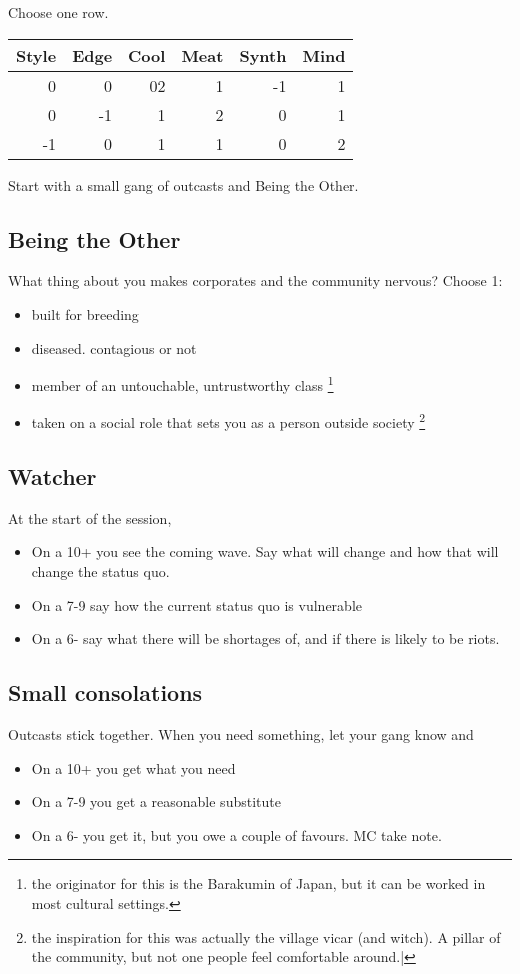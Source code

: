 \documentclass{tufte-book}
\begin{document}
Choose one row.
\begin{table}[ht]
\centering
{}\selectfont
\begin{tabular}{rrrrrr}
\toprule
Style 	& Edge & Cool & Meat & Synth & Mind\\
\midrule
0&0&02&1&-1&1\\
0&-1&1&2&0&1\\
-1&0&1&1&0&2\\
\bottomrule
\end{tabular}
\end{table}

Start with a small gang of outcasts and Being the Other.

\subsection{Being the Other}
What thing about you makes corporates and the community nervous?
Choose 1:
\begin{itemize}
\item built for breeding
\item diseased. contagious or not
\item member of an untouchable, untrustworthy class \footnote{the originator for this is the Barakumin of Japan, but it can be worked in most cultural settings.}
\item taken on a social role that sets you as a person outside society \footnote {the inspiration for this was actually the village vicar (and witch). A pillar of the community, but not one people feel comfortable around.|}
\end{itemize}


\subsection{Watcher}
At the start of the session, 
\begin{itemize}
\item On a 10+ you see the coming wave. Say what will change and how that will change the status quo.
\item On a 7-9 say how the current status quo is vulnerable
\item On a 6- say what there will be shortages of, and if there is likely to be riots.
\end{itemize}

\subsection{Small consolations}
Outcasts stick together. When you need something, let your gang know and 
\begin{itemize}
\item On a 10+ you get what you need
\item On a 7-9 you get a reasonable substitute
\item On a 6- you get it, but you owe a couple of favours. MC take note.
\end{itemize}
\end{document}
